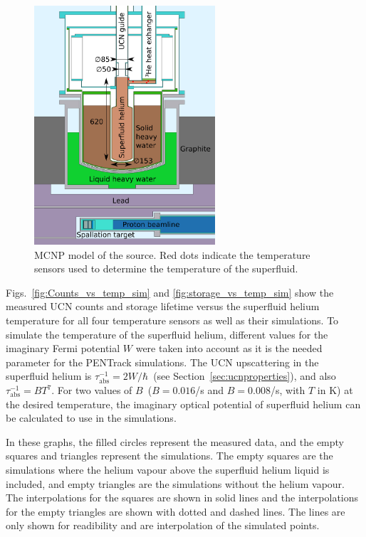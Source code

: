 \begin{figure}[h!]
  \centering
  \includegraphics[width=0.6\textwidth]{MCNPmodel.pdf}
  \caption[MCNP model of the UCN source]{MCNP model of the source. Red
    dots indicate the temperature sensors used to determine the
    temperature of the superfluid.}
  \label{fig:mcnpmodel}
\end{figure}


Figs.~\ref{fig:Counts_vs_temp_sim} and \ref{fig:storage_vs_temp_sim}
show the measured UCN counts and storage lifetime versus the
superfluid helium temperature for all four temperature sensors as well
as their simulations. To simulate the temperature of the superfluid
helium, different values for the imaginary Fermi potential $W$ were
taken into account as it is the needed parameter for the PENTrack
simulations. The UCN upscattering in the superfluid helium is
$\tau_{\mathrm{abs}}^{-1} = 2W/\hbar$~(see
Section~\ref{sec:ucnproperties}), and also
$\tau_{\mathrm{abs}}^{-1} = B T^7$. For two values of
$B$~($B = 0.016$/s and $B = 0.008$/s, with $T$ in K) at the desired
temperature, the imaginary optical potential of superfluid helium can
be calculated to use in the simulations.



In these graphs, the filled circles represent the measured data, and
the empty squares and triangles represent the simulations.  The empty
squares are the simulations where the helium vapour above the
superfluid helium liquid is included, and empty triangles are the
simulations without the helium vapour. The interpolations for the
squares are shown in solid lines and the interpolations for the empty
triangles are shown with dotted and dashed lines. The lines are only
shown for readibility and are interpolation of the simulated points.



